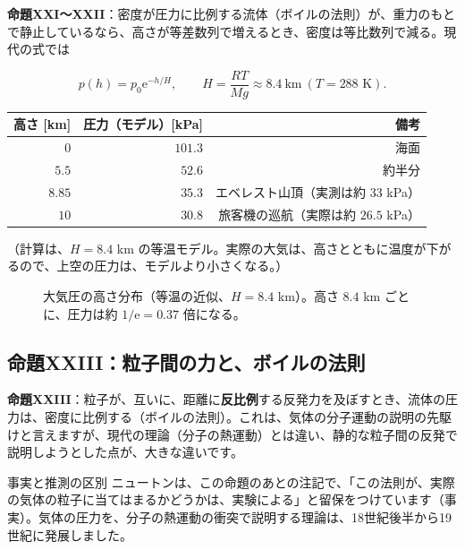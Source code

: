 \documentclass[a4paper,11pt,openany]{ltjsbook}
\newcommand{\ee}{\mathrm{e}}
\begin{document}
\textbf{命題XXI〜XXII}：密度が圧力に比例する流体（ボイルの法則）が、重力のもとで静止しているなら、高さが等差数列で増えるとき、密度は等比数列で減る。現代の式では

\[
p(h)=p_0\ee^{-h/H},\qquad H=\frac{RT}{Mg}\approx8.4\ \text{km}\ (T=288\text{ K}).
\]

\begin{center}
\begin{tabular}{rrr}
\toprule
高さ [km] & 圧力（モデル）[kPa] & 備考\\
\midrule
$0$ & $101.3$ & 海面\\
$5.5$ & $52.6$ & 約半分\\
$8.85$ & $35.3$ & エベレスト山頂（実測は約 $33$ kPa）\\
$10$ & $30.8$ & 旅客機の巡航（実際は約 $26.5$ kPa）\\
\bottomrule
\end{tabular}
\end{center}

（計算は、$H=8.4$ km の等温モデル。実際の大気は、高さとともに温度が下がるので、上空の圧力は、モデルより小さくなる。）

\begin{figure}[htbp]
\centering
{}
\caption{大気圧の高さ分布（等温の近似、$H=8.4$ km）。高さ $8.4$ km ごとに、圧力は約 $1/\ee=0.37$ 倍になる。}
\end{figure}

\subsection{命題XXIII：粒子間の力と、ボイルの法則}

\textbf{命題XXIII}：粒子が、互いに、距離に\textbf{反比例}する反発力を及ぼすとき、流体の圧力は、密度に比例する（ボイルの法則）。これは、気体の分子運動の説明の先駆けと言えますが、現代の理論（分子の熱運動）とは違い、静的な粒子間の反発で説明しようとした点が、大きな違いです。

\begin{notebox}{事実と推測の区別}
ニュートンは、この命題のあとの注記で、「この法則が、実際の気体の粒子に当てはまるかどうかは、実験による」と留保をつけています（事実）。気体の圧力を、分子の熱運動の衝突で説明する理論は、18世紀後半から19世紀に発展しました。
\end{notebox}
\end{document}
